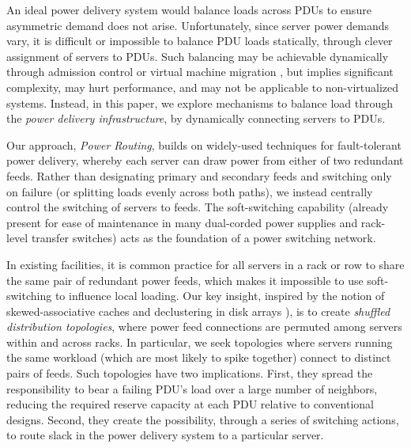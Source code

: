 An ideal power delivery system would balance loads across PDUs to ensure asymmetric demand does not arise.  Unfortunately, since server power demands vary, it is difficult or impossible to balance PDU loads statically, through clever assignment of servers to PDUs.  Such balancing may be achievable dynamically through admission control \cite{Chase01} or virtual machine migration \cite{Clark05}, but implies significant complexity, may hurt performance, and may not be applicable to non-virtualized systems. Instead, in this paper, we explore mechanisms to balance load through the \emph{power delivery infrastructure}, by dynamically connecting servers to PDUs. 

Our approach, \emph{Power Routing}, builds on widely-used techniques for fault-tolerant power delivery, whereby each server can draw power from either of two redundant feeds.  Rather than designating primary and secondary feeds and switching only on failure (or splitting loads evenly across both paths), we instead centrally control the switching of servers to feeds.  The soft-switching capability (already present  for ease of maintenance in many dual-corded power supplies and rack-level transfer switches) acts as the foundation of a power switching network.

In existing facilities, it is common practice for all servers in a rack or row to share the same pair of redundant power feeds, which makes it impossible to use soft-switching to influence local loading.  Our key insight, inspired by the notion of skewed-associative caches \cite{Seznec93} and declustering in disk arrays \cite{Alvarez98}), is to create \emph{shuffled distribution topologies}, where power feed connections are permuted among servers within and across racks. In particular, we seek topologies where servers running the same workload (which are most likely to spike together) connect to distinct pairs of feeds.  Such topologies have two implications.  First, they spread the responsibility to bear a failing PDU's load over a large number of neighbors, reducing the required reserve capacity at each PDU relative to conventional designs.  Second, they create the possibility, through a series of switching actions, to route slack in the power delivery system to a particular server.

